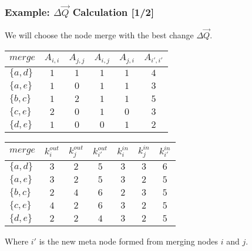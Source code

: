 \documentclass{beamer}
\begin{document}
\begin{frame}

    \frametitle{Example: $ \Delta \vec{Q} $ Calculation [1/2]}

    We will choose the node merge with the best change $ \Delta \vec{Q} $.\pause

    \vspace{2.5mm}
    \begin{center}
        \begin{tabular}{l | c c c c c} 
            $ merge    $ & $ A_{i,i} $ & $ A_{j,j} $ & $ A_{i,j} $ & $ A_{j,i} $ & $ A_{i',i'} $  \\
            \hline
            $ \{a, d\} $ & $ 1 $ & $ 1 $ & $ 1 $ & $ 1 $ & $ 4 $ \\
            $ \{a, e\} $ & $ 1 $ & $ 0 $ & $ 1 $ & $ 1 $ & $ 3 $ \\
            $ \{b, c\} $ & $ 1 $ & $ 2 $ & $ 1 $ & $ 1 $ & $ 5 $ \\
            $ \{c, e\} $ & $ 2 $ & $ 0 $ & $ 1 $ & $ 0 $ & $ 3 $ \\
            $ \{d, e\} $ & $ 1 $ & $ 0 $ & $ 0 $ & $ 1 $ & $ 2 $ \\
        \end{tabular}
    \end{center}\pause

    \begin{center}
        \begin{tabular}{l | c c c c c c} 
            $ merge    $ & $ k_{i}^{out} $ & $ k_{j}^{out} $ & $ k_{i'}^{out} $ & $ k_{i}^{in} $ & $ k_{j}^{in} $ & $ k_{i'}^{in} $ \\
            \hline
            $ \{a, d\} $ & $ 3 $ & $ 2 $ & $ 5 $ & $ 3 $ & $ 3 $ & $ 6 $ \\
            $ \{a, e\} $ & $ 3 $ & $ 2 $ & $ 5 $ & $ 3 $ & $ 2 $ & $ 5 $ \\
            $ \{b, c\} $ & $ 2 $ & $ 4 $ & $ 6 $ & $ 2 $ & $ 3 $ & $ 5 $ \\
            $ \{c, e\} $ & $ 4 $ & $ 2 $ & $ 6 $ & $ 3 $ & $ 2 $ & $ 5 $ \\
            $ \{d, e\} $ & $ 2 $ & $ 2 $ & $ 4 $ & $ 3 $ & $ 2 $ & $ 5 $ \\
        \end{tabular}
    \end{center}\pause

    \vspace{2.5mm}
    Where $ i' $ is the new meta node formed from merging nodes $ i $ and $ j $.

\end{frame}
\end{document}
